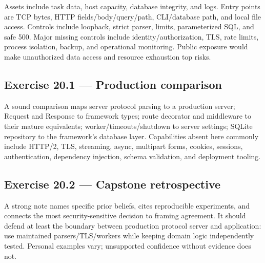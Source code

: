Assets include task data, host capacity, database integrity, and logs. Entry
points are TCP bytes, HTTP fields/body/query/path, CLI/database path, and local
file access. Controls include loopback, strict parser, limits, parameterized SQL,
and safe 500. Major missing controls include identity/authorization, TLS, rate
limits, process isolation, backup, and operational monitoring. Public exposure
would make unauthorized data access and resource exhaustion top risks.

\subsection*{Exercise 20.1 --- Production comparison}

A sound comparison maps server protocol parsing to a production server; Request
and Response to framework types; route decorator and middleware to their mature
equivalents; worker/timeouts/shutdown to server settings; SQLite repository to
the framework's database layer. Capabilities absent here commonly include HTTP/2,
TLS, streaming, async, multipart forms, cookies, sessions, authentication,
dependency injection, schema validation, and deployment tooling.

\subsection*{Exercise 20.2 --- Capstone retrospective}

A strong note names specific prior beliefs, cites reproducible experiments, and
connects the most security-sensitive decision to framing agreement. It should
defend at least the boundary between production protocol server and application:
use maintained parsers/TLS/workers while keeping domain logic independently
tested. Personal examples vary; unsupported confidence without evidence does not.
